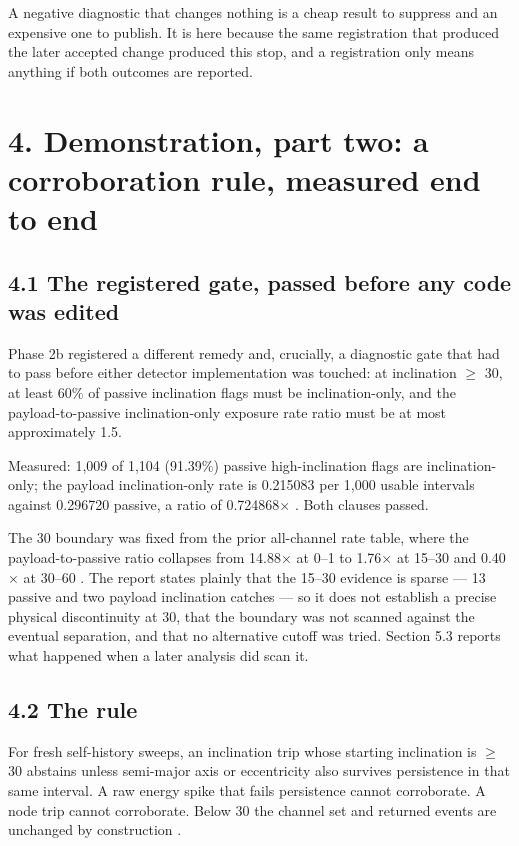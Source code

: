 \documentclass[11pt]{article}
\begin{document}
A negative diagnostic that changes nothing is a cheap result to suppress and an expensive one to publish. It is here because the same registration that produced the later accepted change produced this stop, and a registration only means anything if both outcomes are reported.

\section*{4. Demonstration, part two: a corroboration rule, measured end to end}

\subsection*{4.1 The registered gate, passed before any code was edited}

Phase 2b registered a different remedy and, crucially, a diagnostic gate that had to pass before either detector implementation was touched: at inclination $\ge$ 30\textdegree{}, at least 60\% of passive inclination flags must be inclination-only, and the payload-to-passive inclination-only exposure rate ratio must be at most approximately 1.5.

Measured: 1,009 of 1,104 (91.39\%) passive high-inclination flags are inclination-only; the payload inclination-only rate is 0.215083 per 1,000 usable intervals against 0.296720 passive, a ratio of 0.724868$\times$%
. Both clauses passed.

The 30\textdegree{} boundary was fixed from the prior all-channel rate table, where the payload-to-passive ratio collapses from 14.88$\times$ at 0--1\textdegree{} to 1.76$\times$ at 15--30\textdegree{} and 0.40$\times$ at 30--60\textdegree{}%
. The report states plainly that the 15--30\textdegree{} evidence is sparse --- 13 passive and two payload inclination catches --- so it does not establish a precise physical discontinuity at 30\textdegree{}, that the boundary was not scanned against the eventual separation, and that no alternative cutoff was tried. Section 5.3 reports what happened when a later analysis did scan it.

\subsection*{4.2 The rule}

For fresh self-history sweeps, an inclination trip whose starting inclination is $\ge$ 30\textdegree{} abstains unless semi-major axis or eccentricity also survives persistence in that same interval. A raw energy spike that fails persistence cannot corroborate. A node trip cannot corroborate. Below 30\textdegree{} the channel set and returned events are unchanged by construction%
.
\end{document}
